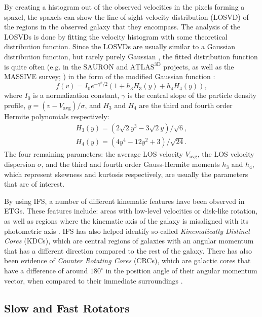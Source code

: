 \documentclass[english, twoside]{HYgradu}
\begin{document}
By creating a histogram out of the observed velocities in the pixels forming a spaxel, the spaxels can show the line-of-sight velocity distribution (LOSVD) of the regions in the observed galaxy that they encompass. The analysis of the LOSVDs is done by fitting the velocity histogram with some theoretical distribution function. Since the LOSVDs are usually similar to a Gaussian distribution function, but rarely purely Gaussian \citep{GalaxyFormationAndEvo2010}, the fitted distribution function is quite often (e.g. in the $\mathrm{SAURON}$ and $\mathrm{ATLAS^{3D}}$ projects, as well as the MASSIVE survey; \citealt{Bacon2001, Cappellari2011, Ma2014MASSIVE}) in the form of the modified Gaussian function \citep{VanDerMarel1993, Bender1994}:
\begin{equation}
f(v) = I_0 e^{-\gamma^2/2}(1 + h_3 H_3(y) + h_4 H_4(y)), \label{eq:mod_gaussian}
\end{equation} 
where $I_0$ is a normalization constant, $\gamma$ is the central slope of the particle density profile, $y = (v - V_\mathrm{avg})/\sigma$, and $H_3$ and $H_4$ are the third and fourth order Hermite polynomials respectively:
\begin{eqnarray}
H_3(y) = \left(2\sqrt{2}y^3 - 3\sqrt{2}y\right) / \sqrt{6}, \\
H_4(y) = \left(4y^4 - 12y^2 + 3 \right) / \sqrt{24}.
\end{eqnarray}
The four remaining parameters: the average LOS velocity $V_\mathrm{avg}$, the LOS velocity dispersion $\sigma$, and the third and fourth order Gauss-Hermite moments $h_3$ and $h_4$, which represent skewness and kurtosis respectively, are usually the parameters that are of interest.

By using IFS, a number of different kinematic features have been observed in ETGs. These features include: areas with low-level velocities or disk-like rotation, as well as regions where the kinematic axis of the galaxy is misaligned with its photometric axis \citep{Emsellem2007}. IFS has also helped identify so-called \textit{Kinematically Distinct Cores} (KDCs), which are central regions of galaxies with an angular momentum that has a different direction compared to the rest of the galaxy. There has also been evidence of \textit{Counter Rotating Cores} (CRCs), which are galactic cores that have a difference of around $180^\circ$ in the position angle of their angular momentum vector, when compared to their immediate surroundings \citep{Krajnovic2011}.

\subsection{Slow and Fast Rotators} \label{section:slow_fast_rotators}
\end{document}
